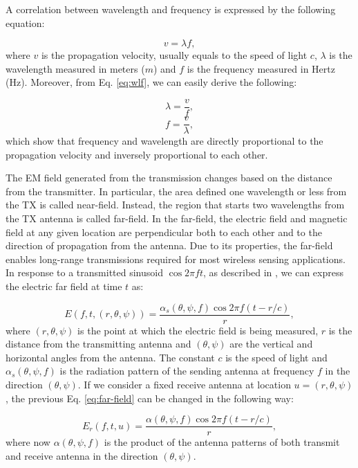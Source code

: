 \documentclass[binding=0.6cm,noexaminfo]{sapthesis}
\begin{document}
A correlation between wavelength and frequency is expressed by the following equation:

\begin{equation}
v = \lambda f,
\label{eq:wlf}
\end{equation}
where $v$ is the propagation velocity, usually equals to the speed of light $c$, $\lambda$ is the wavelength measured in meters ($m$) and $f$ is the frequency measured in Hertz (Hz).
Moreover, from Eq. \ref{eq:wlf}, we can easily derive the following:

\begin{equation}
\lambda = \frac{v}{f},
\end{equation}
\begin{equation}
f= \frac{v}{\lambda},
\end{equation}
which show that frequency and wavelength are directly proportional to the propagation velocity and inversely proportional to each other.

The EM field generated from the transmission changes based on the distance from the transmitter. In particular, the area defined one wavelength or less from the TX is called near-field. Instead, the region that starts two wavelengths from the TX antenna is called far-field. In the far-field, the electric field and magnetic field at any given location are perpendicular both to each other and to the direction of propagation from the antenna.
Due to its properties, the far-field enables long-range transmissions required for most wireless sensing applications.
In response to a transmitted sinusoid $\cos 2\pi f t$, as described in \cite{wireless-communications}, we can express the electric far field at time $t$ as:

\begin{equation}
E(f, t, (r, \theta, \psi)) = \frac{\alpha_s(\theta, \psi, f) \cos 2 \pi f (t - r / c)}{r},
\label{eq:far-field}
\end{equation}
where $(r, \theta, \psi)$ is the point at which the electric field is being measured, $r$ is the distance from the transmitting antenna and $(\theta, \psi)$ are the vertical and horizontal angles from the antenna. The constant $c$ is the speed of light and $\alpha_s(\theta, \psi, f)$ is the radiation pattern of the sending antenna at frequency $f$ in the direction $(\theta, \psi)$.
If we consider a fixed receive antenna at location $u = (r, \theta, \psi)$, the previous Eq. \ref{eq:far-field} can be changed in the following way:

\begin{equation}
E_r(f, t, u) = \frac{\alpha(\theta, \psi, f) \cos 2 \pi f (t - r / c)}{r},
\label{eq:far-field-receiver}
\end{equation}
where now $\alpha(\theta, \psi, f)$ is the product of the antenna patterns of both transmit and receive antenna in the direction $(\theta, \psi)$.
\end{document}
